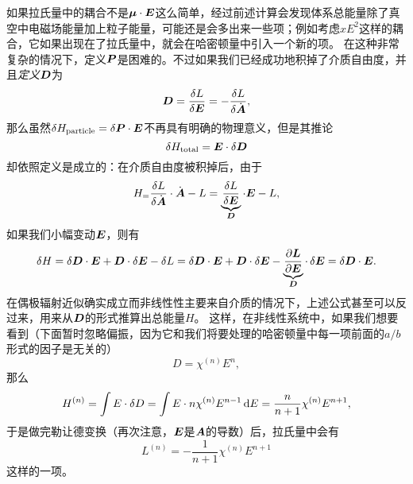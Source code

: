 如果拉氏量中的耦合不是$\vb*{\mu} \cdot \vb*{E}$这么简单，经过前述计算会发现体系总能量除了真空中电磁场能量加上粒子能量，可能还是会多出来一些项；例如考虑$x E^2$这样的耦合，它如果出现在了拉氏量中，就会在哈密顿量中引入一个新的项。
在这种非常复杂的情况下，定义$\vb*{P}$是困难的。不过如果我们已经成功地积掉了介质自由度，并且\emph{定义}$\vb*{D}$为
\begin{equation}
    \vb*{D} = \fdv{L}{\vb*{E}} = - \fdv{L}{\dot{\vb*{A}}},
\end{equation}
那么虽然$\var{H_{\text{particle}}} = \var{\vb*{P}} \cdot \vb*{E}$不再具有明确的物理意义，但是其推论
\begin{equation}
    \var{H_{\text{total}}} = \vb*{E} \cdot \var{\vb*{D}}
\end{equation}
却依照定义是成立的：在介质自由度被积掉后，由于
\begin{equation}
    H_ = \fdv{L}{\dot{\vb*{A}}} \cdot \dot{\vb*{A}} - L 
    = \underbrace{\fdv{L}{\vb*{E}}}_{\vb*{D}} \cdot \vb*{E} - L,
\end{equation}
如果我们小幅变动$\vb*{E}$，则有
\begin{equation}
    \var{H} = \var{\vb*{D}} \cdot \vb*{E} + \vb*{D} \cdot \var{\vb*{E}} - \var{L}
    = \var{\vb*{D}} \cdot \vb*{E} + \vb*{D} \cdot \var{\vb*{E}} - \underbrace{\pdv{\vb*{L}}{\vb*{E}}}_{\vb*{D}} \cdot \var{\vb*{E}}
    = \var{\vb*{D}} \cdot \vb*{E} .
\end{equation}
在偶极辐射近似确实成立而非线性性主要来自介质的情况下，上述公式甚至可以反过来，用来从$\vb*{D}$的形式推算出总能量$H$。
这样，在非线性系统中，如果我们想要看到（下面暂时忽略偏振，因为它和我们将要处理的哈密顿量中每一项前面的$a/b$形式的因子是无关的）
\begin{equation}
    D = \chi^{(n)} E^n,
\end{equation}
那么
\begin{equation}
    H^{(n)} = \int E \cdot \var{D} = 
    \int E \cdot n \chi^{(n)} E^{n-1}  \dd{E}
    = \frac{n}{n+1} \chi^{(n)} E^{n+1},
\end{equation}
于是做完勒让德变换（再次注意，$\vb*{E}$是$\vb*{A}$的导数）后，拉氏量中会有
\begin{equation}
    L^{(n)} = - \frac{1}{n+1} \chi^{(n)} E^{n+1}
    \label{eq:nonlinear-in-lagrangian}
\end{equation}
这样的一项。